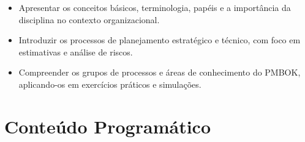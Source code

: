 \documentclass[a4paper, 12pt]{article}
\begin{document}
\begin{itemize}
    \item Apresentar os conceitos básicos, terminologia, papéis e a importância da disciplina no contexto organizacional.
    \item Introduzir os processos de planejamento estratégico e técnico, com foco em estimativas e análise de riscos.
    \item Compreender os grupos de processos e áreas de conhecimento do PMBOK, aplicando-os em exercícios práticos e simulações.
\end{itemize}

\section{Conteúdo Programático}
\end{document}

